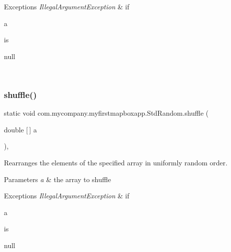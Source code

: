 \begin{DoxyExceptions}{Exceptions}
{\em Illegal\+Argument\+Exception} & if
\begin{DoxyCode}
a 
\end{DoxyCode}
 is
\begin{DoxyCode}
null 
\end{DoxyCode}
 \\
\hline
\end{DoxyExceptions}
\mbox{\label{classcom_1_1mycompany_1_1myfirstmapboxapp_1_1_std_random_ad44d6012a95f3fcc9724a06e564c72ce}} 
\subsubsection{\texorpdfstring{shuffle()}{shuffle()}\hspace{0.1cm}{\footnotesize\ttfamily [2/7]}}
{\footnotesize\ttfamily static void com.\+mycompany.\+myfirstmapboxapp.\+Std\+Random.\+shuffle (\begin{DoxyParamCaption}\item[{double \mbox{[}$\,$\mbox{]}}]{a }\end{DoxyParamCaption})\hspace{0.3cm}{\ttfamily [inline]}, {\ttfamily [static]}}

Rearranges the elements of the specified array in uniformly random order.


\begin{DoxyParams}{Parameters}
{\em a} & the array to shuffle \\
\hline
\end{DoxyParams}

\begin{DoxyExceptions}{Exceptions}
{\em Illegal\+Argument\+Exception} & if
\begin{DoxyCode}
a 
\end{DoxyCode}
 is
\begin{DoxyCode}
null 
\end{DoxyCode}
 \\
\hline
\end{DoxyExceptions}
\mbox{\label{classcom_1_1mycompany_1_1myfirstmapboxapp_1_1_std_random_a2268ef0a6c2ec7a1ec73402330105d84}} 
